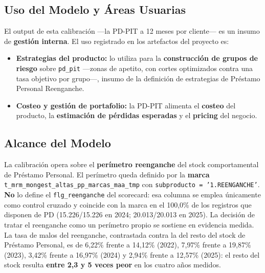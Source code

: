 \documentclass[12pt, a4paper]{article}
\begin{document}
\subsection{Uso del Modelo y Áreas Usuarias}
\label{sec:uso}
El output de esta calibración ---la PD-PIT a 12 meses por cliente--- es un insumo de
\textbf{gestión interna}. El uso registrado en los artefactos del proyecto es:

\begin{itemize}[nosep]
  \item \textbf{Estrategias del producto:} lo utiliza para la \textbf{construcción de grupos de
    riesgo} sobre \texttt{pd\_pit} ---zonas de apetito, con cortes optimizados contra una tasa
    objetivo por grupo---, insumo de la definición de estrategias de Préstamo Personal
    Reenganche.
  \item \textbf{Costeo y gestión de portafolio:} la PD-PIT alimenta el \textbf{costeo} del
    producto, la \textbf{estimación de pérdidas esperadas} y el \textbf{pricing} del negocio.
\end{itemize}

\subsection{Alcance del Modelo}
La calibración opera sobre el \textbf{perímetro reenganche} del stock comportamental de
Préstamo Personal. El perímetro queda definido por la \textbf{marca}
\texttt{t\_mrm\_mongest\_}\allowbreak\texttt{altas\_pp\_}\allowbreak\texttt{marcas\_maa\_tmp} con
\texttt{subproducto\ =\ '1.REENGANCHE'}. \textbf{No} lo define el \texttt{flg\_reenganche} del
scorecard: esa columna se emplea únicamente como control cruzado y coincide con la marca en el
100{,}0\% de los registros que disponen de PD (15.226/15.226 en 2024; 20.013/20.013 en 2025).
La decisión de tratar el reenganche como un perímetro propio se sostiene en evidencia medida. La
tasa de malos del reenganche, contrastada contra la del resto del stock de Préstamo Personal, es
de 6{,}22\% frente a 14{,}12\% (2022), 7{,}97\% frente a 19{,}87\% (2023), 3{,}42\% frente a
16{,}97\% (2024) y 2{,}94\% frente a 12{,}57\% (2025): el resto del stock resulta \textbf{entre
2{,}3 y 5 veces peor} en los cuatro años medidos.
\end{document}
